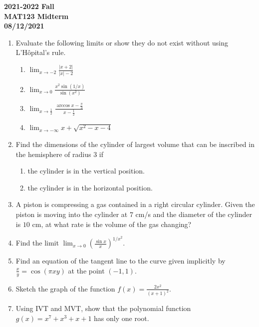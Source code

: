 \documentclass[a4paper, 12pt]{article}
\begin{document}
\newpage
{}
{}

\begin{center}
\textbf{2021-2022 Fall\\MAT123 Midterm\\08/12/2021}
\end{center}

\begin{enumerate}[leftmargin=*,label=\textbf{\arabic*.}]

\item Evaluate the following limits or show they do not exist without using L'Hôpital's rule.

\begin{enumerate}[leftmargin=*,label=\textbf{\alph*.}]
\item $\displaystyle \lim_{x\to-2}\frac{\left|x+2\right|}{\left|x\right|-2}$
\item $\displaystyle\lim_{x\to0}\frac{x^2\sin(1/x)}{\sin\left(x^2\right)}$
\item $\displaystyle \lim_{x\to\frac12}\frac{\arccos x- \frac\pi3}{x-\frac12}$
\item $\displaystyle\lim_{x\to-\infty}x+\sqrt{x^2-x-4}$
\end{enumerate}

\item Find the dimensions of the cylinder of largest volume that can be inscribed in the hemisphere of radius $3$ if

\begin{enumerate}[leftmargin=*,label=\textbf{\alph*.}]
\item the cylinder is in the vertical position.
\item the cylinder is in the horizontal position.
\end{enumerate}

\item A piston is compressing a gas contained in a right circular cylinder. Given the piston is moving into the cylinder at $7 $ cm/s and the diameter of the cylinder is $10$ cm, at what rate is the volume of the gas changing?

\item Find the limit $\displaystyle\lim_{x\to0}\left(\frac{\sin x}x\right)^{1/x^2}$.

\item Find an equation of the tangent line to the curve given implicitly by $\displaystyle \frac xy=\cos\left(\pi xy\right)$ at the point $(-1,1)$.

\item Sketch the graph of the function $\displaystyle f(x)=\frac{2x^2}{\left(x+1\right)^2}$.

\item Using IVT and MVT, show that the polynomial function $g(x) = x^7+x^3+x+1$ has only one root.
\end{enumerate}
\end{document}
